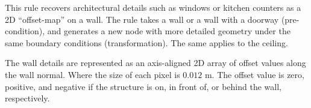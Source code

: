 
 This rule recovers
architectural details such as windows or kitchen counters as a 2D
``offset-map''
on a wall. The rule takes a wall or a wall with a doorway
(pre-condition), and generates a new node with more detailed geometry
under the same boundary conditions (transformation). The same applies to
the ceiling.

The wall details are represented as an axis-aligned 2D array of offset
values along the wall normal. Where the size of each pixel is $0.012$ m. The offset value is zero, positive, and negative if the structure is on, in front of, or behind the wall, respectively.

